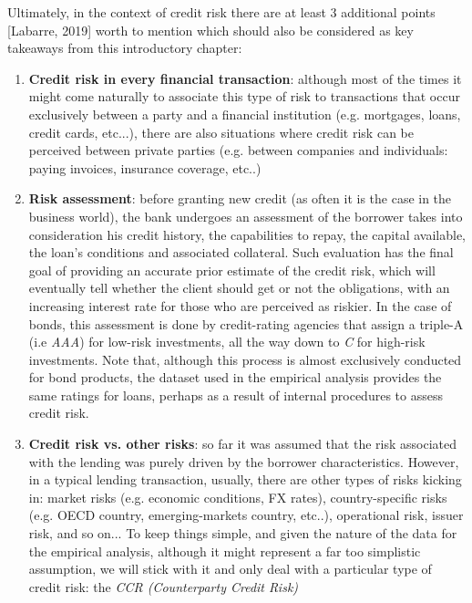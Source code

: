 \documentclass[a4paper,12pt]{article}
\begin{document}
    Ultimately, in the context of credit risk there are at least 3 additional points [Labarre, 2019] 
    worth to mention which should also be considered as key takeaways from this introductory chapter:  
        \begin{enumerate} \item \textbf{Credit risk in every financial transaction}: although most of the times it might come naturally to associate this type of risk to transactions that occur exclusively between a party and a financial institution (e.g. mortgages, loans, credit cards, etc...), there are also situations where credit risk can be perceived between private parties (e.g. between companies and individuals: paying invoices, insurance coverage, etc..)   \item \textbf{Risk assessment}: before granting new credit (as often it is the case in the business world), the bank undergoes an assessment of the borrower takes into consideration his credit history, the capabilities to repay, the capital available, the loan's conditions and associated collateral. Such evaluation has the final goal of providing an accurate prior estimate of the credit risk, which will eventually tell whether the client should get or not the obligations, with an increasing interest rate for those who are perceived as riskier. In the case of bonds, this assessment is done by credit-rating agencies that assign a triple-A (i.e \textit{AAA}) for low-risk investments, all the way down to \textit{C} for high-risk investments. Note that, although this process is almost exclusively conducted for bond products, the dataset used in the empirical analysis provides the same ratings for loans, perhaps as a result of internal procedures to assess credit risk. \item \textbf{Credit risk vs. other risks}: so far it was assumed that the risk associated with the lending was purely driven by the borrower characteristics. However, in a typical lending transaction, usually, there are other types of risks kicking in: market risks (e.g. economic conditions, FX rates), country-specific risks (e.g. OECD country, emerging-markets country, etc..), operational risk, issuer risk, and so on... To keep things simple, and given the nature of the data for the empirical analysis, although it might represent a far too simplistic assumption, we will stick with it and only deal with a particular type of credit risk: the \textit{CCR (Counterparty Credit Risk)}       
        \end{enumerate}
        
\end{document}
